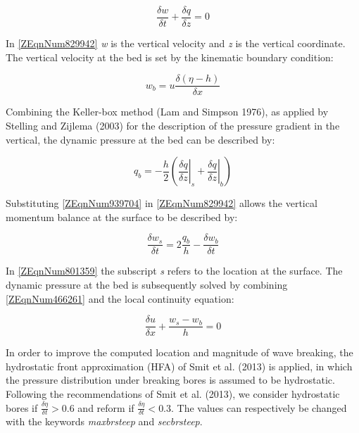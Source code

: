 \documentclass{article}
\begin{document}
\noindent 
\begin{equation} \label{ZEqnNum829942} 
\frac{\delta w}{\delta t} +\frac{\delta q}{\delta z} =0 
\end{equation} 


\noindent In \eqref{ZEqnNum829942} \textit{w} is the vertical velocity and \textit{z} is the vertical coordinate. The vertical velocity at the bed is set by the kinematic boundary condition:

\noindent 
\begin{equation} \label{ZEqnNum939704} 
w_{b} =u\frac{\delta (\eta -h)}{\delta x}  
\end{equation} 


\noindent Combining the Keller-box method (Lam and Simpson 1976), as applied by Stelling and Zijlema (2003) for the description of the pressure gradient in the vertical, the dynamic pressure at the bed can be described by:

\noindent 
\begin{equation} \label{ZEqnNum466261} 
q_{b} =-\frac{h}{2} \left(\left. \frac{\delta q}{\delta z} \right|_{s} +\left. \frac{\delta q}{\delta z} \right|_{b} \right) 
\end{equation} 


\noindent Substituting \eqref{ZEqnNum939704} in \eqref{ZEqnNum829942} allows the vertical momentum balance at the surface to be described by:

\noindent 
\begin{equation} \label{ZEqnNum801359} 
\frac{\delta w_{s} }{\delta t} =2\frac{q_{b} }{h} -\frac{\delta w_{b} }{\delta t}  
\end{equation} 


\noindent In \eqref{ZEqnNum801359} the subscript \textit{s} refers to the location at the surface. The dynamic pressure at the bed is subsequently solved by combining \eqref{ZEqnNum466261} and the local continuity equation:

\noindent 
\begin{equation} \label{2.64)} 
\frac{\delta u}{\delta x} +\frac{w_{s} -w_{b} }{h} =0 
\end{equation} 


\noindent In order to improve the computed location and magnitude of wave breaking, the hydrostatic front approximation (HFA) of Smit et al. (2013) is applied, in which the pressure distribution under breaking bores is assumed to be hydrostatic. Following the recommendations of Smit et al. (2013), we consider hydrostatic bores if $\frac{\delta \eta }{\delta t} >0.6$ and reform if $\frac{\delta \eta }{\delta t} <0.3$. The values can respectively be changed with the keywords \textit{maxbrsteep} and \textit{secbrsteep}. 
\end{document}
